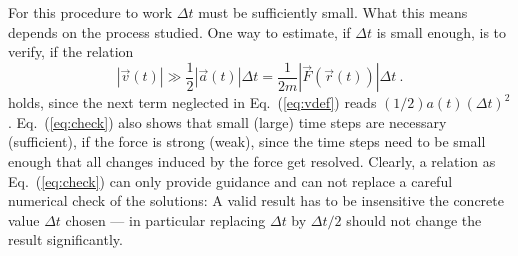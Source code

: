 \documentclass[12pt,ngerman,american]{iopart}
\begin{document}
For this procedure to work $\Delta t$ must be sufficiently small.
What this means depends on the process studied.
One way to estimate, if $\Delta t$ is small enough, is to verify, if the relation
\begin{equation}
|\vec v(t)| \gg \frac12|\vec a(t)|\Delta t = \frac{1}{2m} |\vec F(\vec r(t)) |\Delta t\ . 
\label{eq:check}
\end{equation}
holds, since the next term neglected in Eq.~(\ref{eq:vdef}) reads $(1/2)a(t)(\Delta t)^2$.
Eq.~({\ref{eq:check}}) also shows that small (large) time steps are necessary (sufficient), if the force is strong (weak), since the time steps need to be small enough that all changes induced by the force get resolved.
Clearly, a relation as Eq.~({\ref{eq:check}}) can only provide guidance and can not replace a careful numerical check of the solutions: A valid result has to be insensitive the concrete value $\Delta t$ chosen --- in particular replacing $\Delta t$ by $\Delta t/2$ should not change the result significantly.



\end{document}
